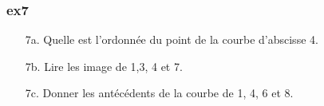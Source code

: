 \documentclass[11pt]{article}
\begin{document}
\begin{multicols}{2}
  
  \subsubsection*{ex7}
\begin{enumerate}
  \item[7a.] Quelle est l'ordonnée du point de la courbe d'abscisse 4.
  \item[7b.] Lire les image de 1,3, 4 et 7.
  \item[7c.] Donner les antécédents de la courbe de 1, 4, 6 et 8.
\end{enumerate}


\end{multicols}
\end{document}
